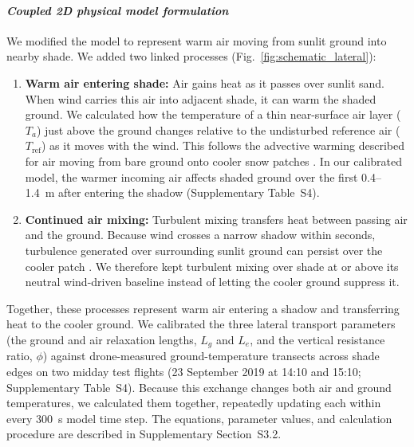 \documentclass[12pt]{article}
\begin{document}
\paragraph*{\textit{Coupled 2D physical model formulation}}
We modified the \citet{Itzkovitch2025} model to represent warm air moving from sunlit ground into nearby shade. We added two linked processes (Fig.~\ref{fig:schematic_lateral}):
\begin{enumerate}[leftmargin=*, nosep]
    \item \textbf{Warm air entering shade:} Air gains heat as it passes over sunlit sand. When wind carries this air into adjacent shade, it can warm the shaded ground. We calculated how the temperature of a thin near-surface air layer ($T_a$) just above the ground changes relative to the undisturbed reference air ($T_\text{ref}$) as it moves with the wind. This follows the advective warming described for air moving from bare ground onto cooler snow patches \citep{mott_2013}. In our calibrated model, the warmer incoming air affects shaded ground over the first 0.4--1.4~m after entering the shadow (Supplementary Table~S4).
    \item \textbf{Continued air mixing:} Turbulent mixing transfers heat between passing air and the ground. Because wind crosses a narrow shadow within seconds, turbulence generated over surrounding sunlit ground can persist over the cooler patch \citep{helgason_2012}. We therefore kept turbulent mixing over shade at or above its neutral wind-driven baseline instead of letting the cooler ground suppress it.
\end{enumerate}
Together, these processes represent warm air entering a shadow and transferring heat to the cooler ground. We calibrated the three lateral transport parameters (the ground and air relaxation lengths, $L_g$ and $L_e$, and the vertical resistance ratio, $\phi$) against drone-measured ground-temperature transects across shade edges on two midday test flights (23 September 2019 at 14:10 and 15:10; Supplementary Table~S4). Because this exchange changes both air and ground temperatures, we calculated them together, repeatedly updating each within every 300~s model time step. The equations, parameter values, and calculation procedure are described in Supplementary Section~S3.2.
\end{document}
